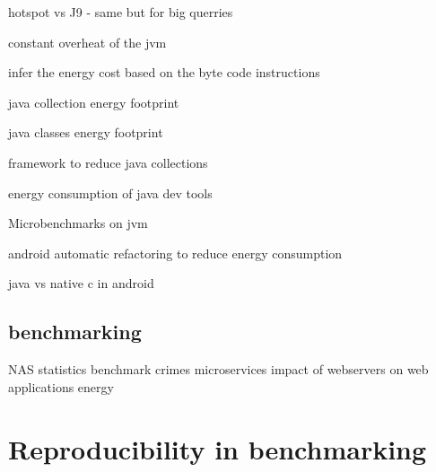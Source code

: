 hotspot vs J9 \cite{oi2011power} - same but for big querries \cite{chiba2018towards}

constant overheat of the jvm \cite{lafond2006energy}

infer the energy cost based on the byte code instructions \cite{ma2017biogeography}

java collection energy footprint  \cite{pinto2016comprehensive} \cite{fernandes2017assisting}

java classes energy footprint \cite{hasan2016energy}

framework to reduce java collections \cite{manotas2014seeds}

energy consumption of java dev tools \cite{baskar2013experimental}

Microbenchmarks on jvm \cite{longo2019reducing} \cite{baskar2013experimental}

android automatic refactoring to reduce energy consumption \cite{banerjee2016automated} \cite{rodriguez2017reducing}

java vs native c in android \cite{corral2014method}





\subsection{benchmarking}
NAS \cite{bailey_nas_nodate}
statistics \cite{he_statistics-based_2019}
benchmark crimes \cite{van_der_kouwe_benchmarking_2018}
microservices \cite{grambow_benchmarking_2020}
impact of webservers on web applications energy \cite{manotas_investigating_2013}

\section{Reproducibility in benchmarking }




